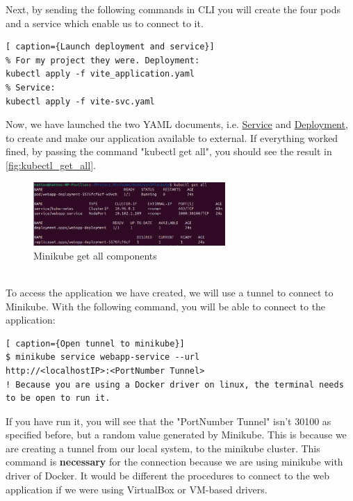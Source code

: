 Next, by sending the following commands in CLI you will create the four pods and a service which enable us to connect to it. \\
\begin{lstlisting}[ caption={Launch deployment and service}]
% For my project they were. Deployment:
kubectl apply -f vite_application.yaml
% Service:
kubectl apply -f vite-svc.yaml
\end{lstlisting}
Now, we have launched the two YAML documents, i.e. \hyperref[lst:yaml_4_pods_svc]{Service} and \hyperref[lst:yaml_4_pods]{Deployment}, to create and make our application available to external. If everything worked fined, by passing the command "kubectl get all", you should see the result in \autoref{fig:kubectl_get_all}.
\begin{figure}[h!]
    \centering
    \includegraphics[width=0.65\textwidth]{images/kubectl_get_all.png}
    \caption{Minikube get all components}
    \label{fig:kubectl_get_all}
\end{figure} \\
To access the application we have created, we will use a tunnel to connect to Minikube. With the following command, you will be able to connect to the application:
\begin{lstlisting}[ caption={Open tunnel to minikube}]
$ minikube service webapp-service --url
http://<localhostIP>:<PortNumber Tunnel>
! Because you are using a Docker driver on linux, the terminal needs to be open to run it.
\end{lstlisting}
If you have run it, you will see that the "PortNumber Tunnel" isn't 30100 as specified before, but a random value generated by Minikube. This is because we are creating a tunnel from our local system, to the minikube cluster. This command is \textbf{necessary} for the connection because we are using minikube with driver of Docker. It would be different the procedures to connect to the web application if we were using VirtualBox or VM-based drivers.

